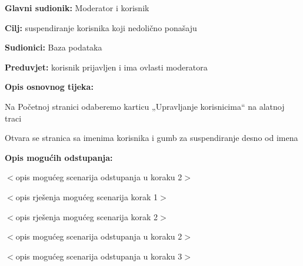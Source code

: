 	\noindent {}
\begin{packed_item}
	
	\item \textbf{Glavni sudionik: }Moderator i korisnik
	\item  \textbf{Cilj:} suspendiranje korisnika koji nedolično ponašaju
	\item  \textbf{Sudionici:}
	Baza podataka
	\item  \textbf{Preduvjet:} korisnik prijavljen i ima ovlasti moderatora
	\item  \textbf{Opis osnovnog tijeka:}
	
	\item[] \begin{packed_enum}
		
		\item	Na Početnoj stranici odaberemo karticu „Upravljanje korisnicima“ na alatnoj traci
		\item	Otvara se stranica sa imenima korisnika i gumb za suspendiranje desno od imena
		
	\end{packed_enum}
	
	\item  \textbf{Opis mogućih odstupanja:}
	
	\item[] \begin{packed_item}
		
		\item[2.a] $<$opis mogućeg scenarija odstupanja u koraku 2$>$
		\item[] \begin{packed_enum}
			
			\item $<$opis rješenja mogućeg scenarija korak 1$>$
			\item $<$opis rješenja mogućeg scenarija korak 2$>$
			
		\end{packed_enum}
		\item[2.b] $<$opis mogućeg scenarija odstupanja u koraku 2$>$
		\item[3.a] $<$opis mogućeg scenarija odstupanja  u koraku 3$>$
		
	\end{packed_item}
\end{packed_item}

